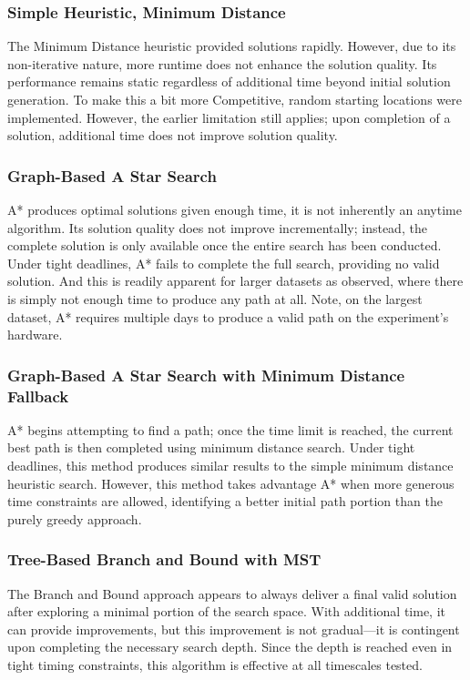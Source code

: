 \documentclass[11pt]{article}
\begin{document}
	
	\subsubsection{Simple Heuristic, Minimum Distance}
	The Minimum Distance heuristic provided solutions rapidly. However, due to its non-iterative nature, more runtime does not enhance the solution quality. Its performance remains static regardless of additional time beyond initial solution generation. To make this a bit more Competitive, random starting locations were implemented. However, the earlier limitation still applies; upon completion of a solution, additional time does not improve solution quality.
	
	\subsubsection{Graph-Based A Star Search}
	A* produces optimal solutions given enough time, it is not inherently an anytime algorithm. Its solution quality does not improve incrementally; instead, the complete solution is only available once the entire search has been conducted. Under tight deadlines, A* fails to complete the full search, providing no valid solution. And this is readily apparent for larger datasets as observed, where there is simply not enough time to produce any path at all. Note, on the largest dataset, A* requires multiple days to produce a valid path on the experiment's hardware.
	
	\subsubsection{Graph-Based A Star Search with Minimum Distance Fallback}
	A* begins attempting to find a path; once the time limit is reached, the current best path is then completed using minimum distance search. Under tight deadlines, this method produces similar results to the simple minimum distance heuristic search. However, this method takes advantage A* when more generous time constraints are allowed, identifying a better initial path portion than the purely greedy approach.
	
	\subsubsection{Tree-Based Branch and Bound with MST} 
	The Branch and Bound approach appears to always deliver a final valid solution after exploring a minimal portion of the search space. With additional time, it can provide improvements, but this improvement is not gradual—it is contingent upon completing the necessary search depth. Since the depth is reached even in tight timing constraints, this algorithm is effective at all timescales tested.
	
\end{document}
